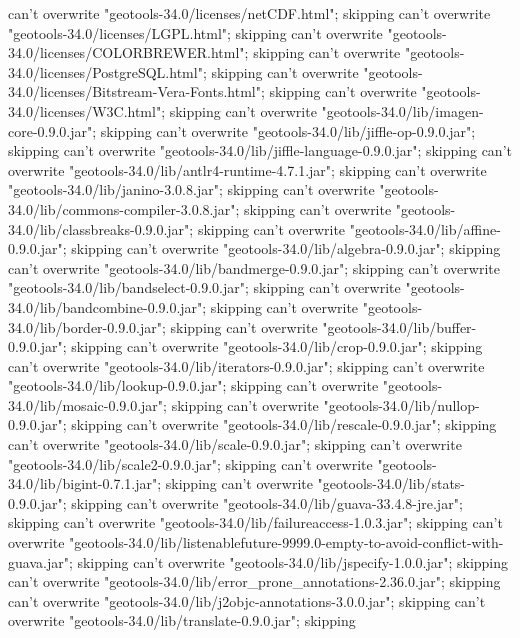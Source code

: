     can't overwrite "geotools-34.0/licenses/netCDF.html"; skipping
    can't overwrite "geotools-34.0/licenses/LGPL.html"; skipping
    can't overwrite "geotools-34.0/licenses/COLORBREWER.html"; skipping
    can't overwrite "geotools-34.0/licenses/PostgreSQL.html"; skipping
    can't overwrite "geotools-34.0/licenses/Bitstream-Vera-Fonts.html"; skipping
    can't overwrite "geotools-34.0/licenses/W3C.html"; skipping
    can't overwrite "geotools-34.0/lib/imagen-core-0.9.0.jar"; skipping
    can't overwrite "geotools-34.0/lib/jiffle-op-0.9.0.jar"; skipping
    can't overwrite "geotools-34.0/lib/jiffle-language-0.9.0.jar"; skipping
    can't overwrite "geotools-34.0/lib/antlr4-runtime-4.7.1.jar"; skipping
    can't overwrite "geotools-34.0/lib/janino-3.0.8.jar"; skipping
    can't overwrite "geotools-34.0/lib/commons-compiler-3.0.8.jar"; skipping
    can't overwrite "geotools-34.0/lib/classbreaks-0.9.0.jar"; skipping
    can't overwrite "geotools-34.0/lib/affine-0.9.0.jar"; skipping
    can't overwrite "geotools-34.0/lib/algebra-0.9.0.jar"; skipping
    can't overwrite "geotools-34.0/lib/bandmerge-0.9.0.jar"; skipping
    can't overwrite "geotools-34.0/lib/bandselect-0.9.0.jar"; skipping
    can't overwrite "geotools-34.0/lib/bandcombine-0.9.0.jar"; skipping
    can't overwrite "geotools-34.0/lib/border-0.9.0.jar"; skipping
    can't overwrite "geotools-34.0/lib/buffer-0.9.0.jar"; skipping
    can't overwrite "geotools-34.0/lib/crop-0.9.0.jar"; skipping
    can't overwrite "geotools-34.0/lib/iterators-0.9.0.jar"; skipping
    can't overwrite "geotools-34.0/lib/lookup-0.9.0.jar"; skipping
    can't overwrite "geotools-34.0/lib/mosaic-0.9.0.jar"; skipping
    can't overwrite "geotools-34.0/lib/nullop-0.9.0.jar"; skipping
    can't overwrite "geotools-34.0/lib/rescale-0.9.0.jar"; skipping
    can't overwrite "geotools-34.0/lib/scale-0.9.0.jar"; skipping
    can't overwrite "geotools-34.0/lib/scale2-0.9.0.jar"; skipping
    can't overwrite "geotools-34.0/lib/bigint-0.7.1.jar"; skipping
    can't overwrite "geotools-34.0/lib/stats-0.9.0.jar"; skipping
    can't overwrite "geotools-34.0/lib/guava-33.4.8-jre.jar"; skipping
    can't overwrite "geotools-34.0/lib/failureaccess-1.0.3.jar"; skipping
    can't overwrite "geotools-34.0/lib/listenablefuture-9999.0-empty-to-avoid-conflict-with-guava.jar"; skipping
    can't overwrite "geotools-34.0/lib/jspecify-1.0.0.jar"; skipping
    can't overwrite "geotools-34.0/lib/error_prone_annotations-2.36.0.jar"; skipping
    can't overwrite "geotools-34.0/lib/j2objc-annotations-3.0.0.jar"; skipping
    can't overwrite "geotools-34.0/lib/translate-0.9.0.jar"; skipping

